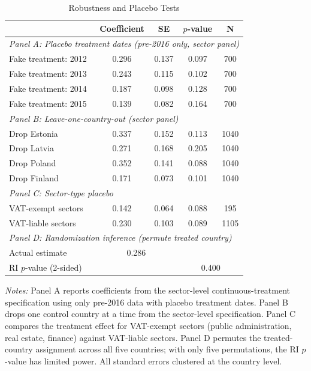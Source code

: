 \begin{table}[t]
\centering
\caption{Robustness and Placebo Tests}
\label{tab:robustness}
\small
\begin{tabular}{lcccc}
\hline\hline
 & Coefficient & SE & $p$-value & N \\
\hline
\multicolumn{5}{l}{\textit{Panel A: Placebo treatment dates (pre-2016 only, sector panel)}} \\[3pt]
Fake treatment: 2012 & 0.296 & 0.137 & 0.097 & 700 \\
Fake treatment: 2013 & 0.243 & 0.115 & 0.102 & 700 \\
Fake treatment: 2014 & 0.187 & 0.098 & 0.128 & 700 \\
Fake treatment: 2015 & 0.139 & 0.082 & 0.164 & 700 \\
\hline
\multicolumn{5}{l}{\textit{Panel B: Leave-one-country-out (sector panel)}} \\[3pt]
Drop Estonia & 0.337 & 0.152 & 0.113 & 1040 \\
Drop Latvia & 0.271 & 0.168 & 0.205 & 1040 \\
Drop Poland & 0.352 & 0.141 & 0.088 & 1040 \\
Drop Finland & 0.171 & 0.073 & 0.101 & 1040 \\
\hline
\multicolumn{5}{l}{\textit{Panel C: Sector-type placebo}} \\[3pt]
VAT-exempt sectors & 0.142 & 0.064 & 0.088 & 195 \\
VAT-liable sectors & 0.230 & 0.103 & 0.089 & 1105 \\
\hline
\multicolumn{5}{l}{\textit{Panel D: Randomization inference (permute treated country)}} \\[3pt]
Actual estimate & \multicolumn{2}{c}{0.286} & \multicolumn{2}{c}{} \\
RI $p$-value (2-sided) & \multicolumn{2}{c}{} & \multicolumn{2}{c}{0.400} \\
\hline\hline
\end{tabular}
\begin{tablenotes}
\item \textit{Notes:} Panel A reports coefficients from the sector-level continuous-treatment specification using only pre-2016 data with placebo treatment dates. Panel B drops one control country at a time from the sector-level specification. Panel C compares the treatment effect for VAT-exempt sectors (public administration, real estate, finance) against VAT-liable sectors. Panel D permutes the treated-country assignment across all five countries; with only five permutations, the RI $p$-value has limited power. All standard errors clustered at the country level.
\end{tablenotes}
\end{table}
